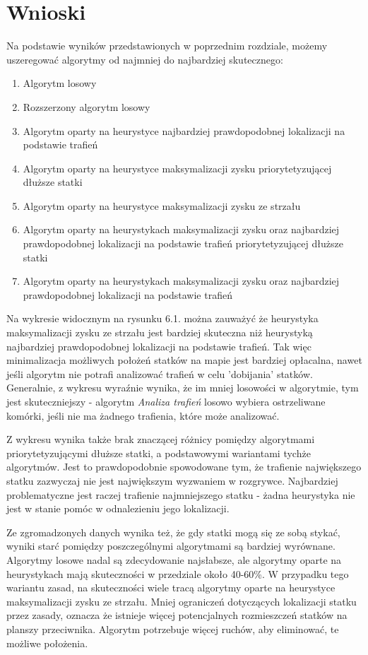 \newpage %
\section{Wnioski}

Na podstawie wyników przedstawionych w poprzednim rozdziale, możemy uszeregować algorytmy od najmniej do najbardziej skutecznego:\begin{enumerate}
    \item Algorytm losowy
    \item Rozszerzony algorytm losowy
    \item Algorytm oparty na heurystyce najbardziej prawdopodobnej lokalizacji na podstawie trafień
    \item Algorytm oparty na heurystyce maksymalizacji zysku priorytetyzującej dłuższe statki
    \item Algorytm oparty na heurystyce maksymalizacji zysku ze strzału
        \item Algorytm oparty na heurystykach maksymalizacji zysku oraz najbardziej prawdopodobnej lokalizacji na podstawie trafień priorytetyzującej dłuższe statki
    \item Algorytm oparty na heurystykach maksymalizacji zysku oraz najbardziej prawdopodobnej lokalizacji na podstawie trafień
\end{enumerate}

Na wykresie widocznym na rysunku 6.1. można zauważyć że heurystyka maksymalizacji zysku ze strzału jest bardziej skuteczna niż heurystyką najbardziej prawdopodobnej lokalizacji na podstawie trafień. Tak więc minimalizacja możliwych położeń statków na mapie jest bardziej opłacalna, nawet jeśli algorytm nie potrafi analizować trafień w celu 'dobijania' statków. Generalnie, z wykresu wyraźnie wynika, że im mniej losowości w algorytmie, tym jest skuteczniejszy - algorytm \emph{Analiza trafień} losowo wybiera ostrzeliwane komórki, jeśli nie ma żadnego trafienia, które może analizować.

Z wykresu wynika także brak znaczącej różnicy pomiędzy algorytmami priorytetyzującymi dłuższe statki, a podstawowymi wariantami tychże algorytmów. Jest to prawdopodobnie spowodowane tym, że trafienie największego statku zazwyczaj nie jest największym wyzwaniem w rozgrywce. Najbardziej problematyczne jest raczej trafienie najmniejszego statku - żadna heurystyka nie jest w stanie pomóc w odnalezieniu jego lokalizacji.

Ze zgromadzonych danych wynika też, że gdy statki mogą się ze sobą stykać, wyniki starć pomiędzy poszczególnymi algorytmami są bardziej wyrównane. Algorytmy losowe nadal są zdecydowanie najsłabsze, ale algorytmy oparte na heurystykach mają skuteczności w przedziale około 40-60\%. W przypadku tego wariantu zasad, na skuteczności wiele tracą algorytmy oparte na heurystyce maksymalizacji zysku ze strzału. Mniej ograniczeń dotyczących lokalizacji statku przez zasady, oznacza że istnieje więcej potencjalnych rozmieszczeń statków na planszy przeciwnika. Algorytm potrzebuje więcej ruchów, aby eliminować, te możliwe położenia. 

